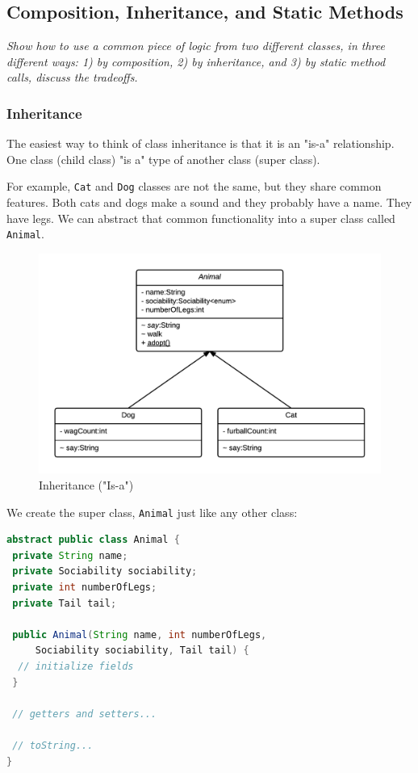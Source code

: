\subsection{Composition, Inheritance, and Static Methods}
\textit{Show how to use a common piece of logic from two different classes, in three different ways: 1) by composition, 2) by inheritance, and 3) by static method calls, discuss the tradeoffs.}

\subsubsection{Inheritance}\label{s:inheritance}
The easiest way to think of class inheritance is that it is an "is-a" relationship. One class (child class) "is a" type of another class (super class).

For example, \texttt{Cat} and \texttt{Dog} classes are not the same, but they share common features. Both cats and dogs make a sound and they probably have a name. They have legs. We can abstract that common functionality into a super class called \texttt{Animal}.

\begin{figure}[H]\centering %
\includegraphics[width=0.9\linewidth, frame]{images/inheritance}
\caption{Inheritance ("Is-a")}
\label{fig:inheritance}
\end{figure}

We create the super class, \texttt{Animal} just like any other class:

\begin{lstlisting}[language=Java]
abstract public class Animal {
 private String name;
 private Sociability sociability;
 private int numberOfLegs;
 private Tail tail;

 public Animal(String name, int numberOfLegs, 
     Sociability sociability, Tail tail) {
  // initialize fields
 }

 // getters and setters...
 
 // toString...
}
\end{lstlisting}

